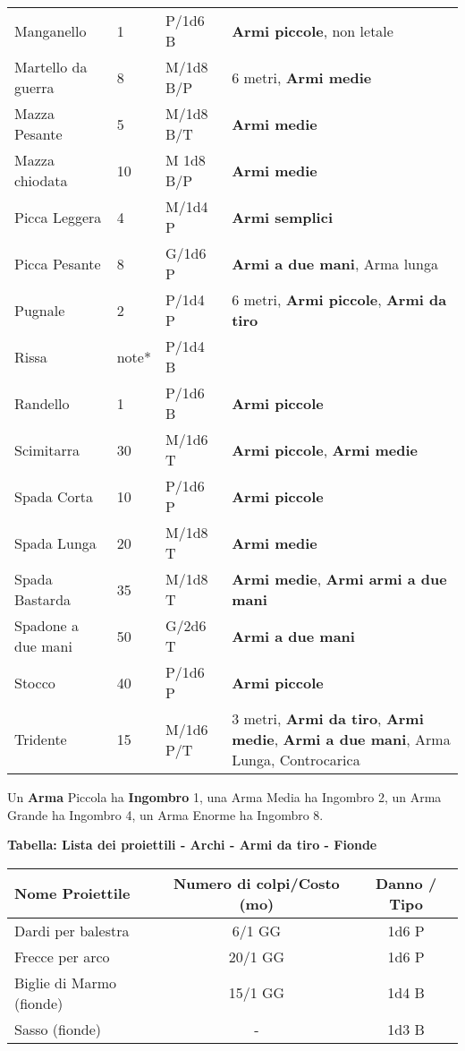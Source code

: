 \documentclass[12pt,a4paper,twoside,openany]{book}
\begin{document}
\begin{xltabular}{0.99\textwidth}{lllX}
Manganello& 1& P/1d6 B& \textbf{Armi piccole}, non letale\\
Martello da guerra& 8& M/1d8 B/P& 6 metri, \textbf{Armi medie}\\
Mazza Pesante& 5& M/1d8 B/T& \textbf{Armi medie}\\
Mazza chiodata& 10& M 1d8 B/P& \textbf{Armi medie}\\
Picca Leggera& 4& M/1d4 P&\textbf{Armi semplici}\\
Picca Pesante& 8& G/1d6 P&\textbf{Armi a due mani}, Arma lunga\\
Pugnale& 2& P/1d4 P& 6 metri, \textbf{Armi piccole}, \textbf{Armi da tiro}\\
Rissa& note*& P/1d4 B&\\
Randello& 1& P/1d6 B& \textbf{Armi piccole}\\
Scimitarra& 30 & M/1d6 T&\textbf{Armi piccole}, \textbf{Armi medie}\\
Spada Corta& 10 & P/1d6 P&\textbf{Armi piccole}\\
Spada Lunga& 20 & M/1d8 T&\textbf{Armi medie}\\
Spada Bastarda& 35 & M/1d8 T&\textbf{Armi medie}, \textbf{Armi armi a due mani}\\
Spadone a due mani& 50 & G/2d6 T&\textbf{Armi a due mani}\\
Stocco& 40 & P/1d6 P& \textbf{Armi piccole}\\
Tridente& 15 & M/1d6 P/T& 3 metri, \textbf{Armi da tiro}, \textbf{Armi medie}, \textbf{Armi a due mani}, Arma Lunga, Controcarica\\
\end{xltabular}

\medskip

Un \textbf{Arma} Piccola ha \textbf{Ingombro} 1, una Arma Media ha Ingombro 2, un Arma Grande ha Ingombro 4, un Arma Enorme ha Ingombro 8.

\medskip

\textbf{Tabella: Lista dei proiettili - Archi - Armi da tiro - Fionde}

\begin{tabular}{lcc}
\textbf{Nome Proiettile}& \textbf{Numero di colpi/Costo (mo)} & \textbf{Danno / Tipo}\\
\toprule
Dardi per balestra & 6/1 GG & 1d6 P\\
Frecce per arco& 20/1 GG & 1d6 P\\
Biglie di Marmo (fionde)& 15/1 GG & 1d4 B\\
Sasso (fionde)& -& 1d3 B\\
\end{tabular}
\end{document}
